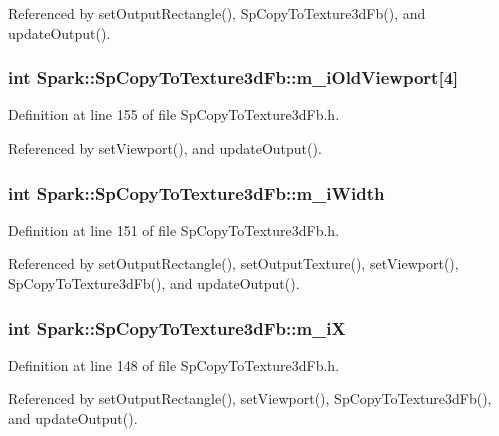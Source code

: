 Referenced by set\-Output\-Rectangle(), Sp\-Copy\-To\-Texture3d\-Fb(), and update\-Output().
\subsubsection{\setlength{\rightskip}{0pt plus 5cm}int {\bf Spark::Sp\-Copy\-To\-Texture3d\-Fb::m\_\-i\-Old\-Viewport}[4]\hspace{0.3cm}{\tt  [protected]}}\label{classSpark_1_1SpCopyToTexture3dFb_p9}


Definition at line 155 of file Sp\-Copy\-To\-Texture3d\-Fb.h.

Referenced by set\-Viewport(), and update\-Output().
\subsubsection{\setlength{\rightskip}{0pt plus 5cm}int {\bf Spark::Sp\-Copy\-To\-Texture3d\-Fb::m\_\-i\-Width}\hspace{0.3cm}{\tt  [protected]}}\label{classSpark_1_1SpCopyToTexture3dFb_p6}


Definition at line 151 of file Sp\-Copy\-To\-Texture3d\-Fb.h.

Referenced by set\-Output\-Rectangle(), set\-Output\-Texture(), set\-Viewport(), Sp\-Copy\-To\-Texture3d\-Fb(), and update\-Output().
\subsubsection{\setlength{\rightskip}{0pt plus 5cm}int {\bf Spark::Sp\-Copy\-To\-Texture3d\-Fb::m\_\-i\-X}\hspace{0.3cm}{\tt  [protected]}}\label{classSpark_1_1SpCopyToTexture3dFb_p4}


Definition at line 148 of file Sp\-Copy\-To\-Texture3d\-Fb.h.

Referenced by set\-Output\-Rectangle(), set\-Viewport(), Sp\-Copy\-To\-Texture3d\-Fb(), and update\-Output().
